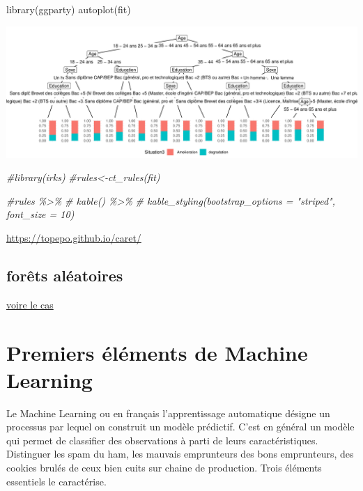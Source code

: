 \documentclass[
]{book}
\newenvironment{Shaded}{\begin{snugshade}}{\end{snugshade}}
\newcommand{\CommentTok}[1]{\textcolor[rgb]{0.56,0.35,0.01}{\textit{#1}}}
\newcommand{\FunctionTok}[1]{\textcolor[rgb]{0.00,0.00,0.00}{#1}}
\newcommand{\NormalTok}[1]{#1}
\begin{document}
\begin{Shaded}
\begin{Highlighting}[]
\FunctionTok{library}\NormalTok{(ggparty)}
\FunctionTok{autoplot}\NormalTok{(fit)}
\end{Highlighting}
\end{Shaded}

\includegraphics{bookdown-demo_files/figure-latex/1201-1.pdf}

\begin{Shaded}
\begin{Highlighting}[]
\CommentTok{\#library(irks)}
\CommentTok{\#rules\textless{}{-}ct\_rules(fit)}

\CommentTok{\#rules \%\textgreater{}\% }
\CommentTok{\#  kable() \%\textgreater{}\%}
\CommentTok{\#  kable\_styling(bootstrap\_options = "striped", font\_size = 10)}
\end{Highlighting}
\end{Shaded}

\url{https://topepo.github.io/caret/}

\hypertarget{foruxeats-aluxe9atoires}{%
\section{forêts aléatoires}\label{foruxeats-aluxe9atoires}}

\href{http://r.benavent.fr/caret.html}{voire le cas}

\hypertarget{premiers-uxe9luxe9ments-de-machine-learning}{%
\chapter{Premiers éléments de Machine Learning}\label{premiers-uxe9luxe9ments-de-machine-learning}}

Le Machine Learning ou en français l'apprentissage automatique désigne un processus par lequel on construit un modèle prédictif. C'est en général un modèle qui permet de classifier des observations à parti de leurs caractéristiques. Distinguer les spam du ham, les mauvais emprunteurs des bons emprunteurs, des cookies brulés de ceux bien cuits sur chaine de production. Trois éléments essentiels le caractérise.
\end{document}

